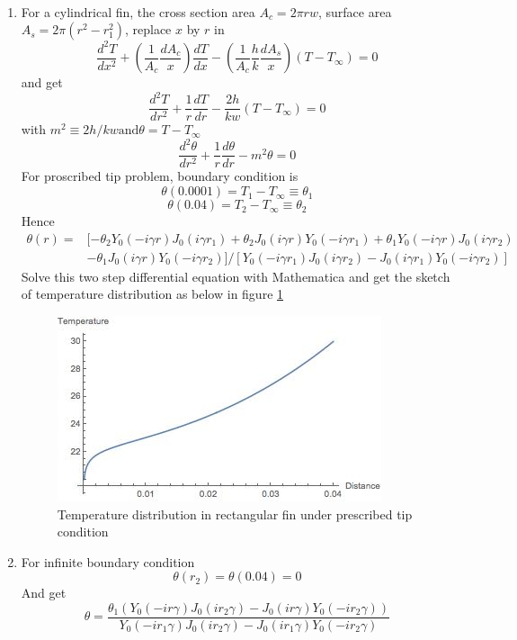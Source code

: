 \begin{solution}
~\\
\begin{enumerate}
\item For a cylindrical fin, the cross section area $A_c=2\pi rw$,
surface area $A_s=2\pi(r^2-r_1^2)$, replace $x$ by $r$ in
$$
\frac{d^2 T}{dx^2} + 
\left(\frac{1}{A_c}\frac{dA_c}{x}\right)\frac{dT}{dx}-
\left(\frac{1}{A_c}\frac{h}{k}\frac{dA_s}{x}\right)(T-T_\infty)=0
$$
and get
$$
\frac{d^2 T}{dr^2}+
\frac{1}{r}\frac{dT}{dr}-
\frac{2h}{kw}(T-T_\infty)=0
$$
with $m^2 \equiv 2h/kw \text{and} \theta=T-T_\infty$
$$
\frac{d^2 \theta}{dr^2}+
\frac{1}{r}\frac{d\theta}{dr}-
m^2\theta=0
$$
For proscribed tip problem, boundary condition is 
$$\theta(0.0001)=T_1-T_\infty \equiv \theta_1$$
$$\theta(0.04)=T_2-T_\infty \equiv \theta_2$$
Hence
\begin{equation*}
\begin{aligned}
\theta(r)=&[-\theta_2 Y_0(-i \gamma r) J_0(i \gamma r_1)+\theta_2 J_0(i \gamma r) Y_0(-i \gamma r_1)+\theta_1 Y_0(-i \gamma r) J_0(i \gamma r_2)\\
&-\theta_1 J_0(i \gamma r) Y_0(-i \gamma r_2)]/[Y_0(-i \gamma r_1) J_0(i \gamma r_2)-J_0(i \gamma r_1) Y_0(-i \gamma r_2)]
\end{aligned}
\end{equation*}
Solve this two step differential equation with Mathematica and get the sketch of temperature distribution as below in figure \ref{fig:2:17}
\begin{figure}[h!]
  \centering
    \includegraphics[scale=1]{figures/ch2/17}
    \caption{Temperature distribution in rectangular fin under prescribed tip condition}
    \label{fig:2:17}
\end{figure}
\item For infinite boundary condition
$$\theta(r_2)=\theta(0.04)=0$$
And get
$$\theta=\frac{\theta_1 (Y_0(-ir\gamma)J_0(ir_2\gamma)-J_0(ir\gamma)Y_0(-ir_2\gamma))}{Y_0(-ir_1\gamma)J_0(ir_2\gamma)-J_0(ir_1\gamma)Y_0(-ir_2\gamma)}$$

\end{enumerate}
\end{solution}
